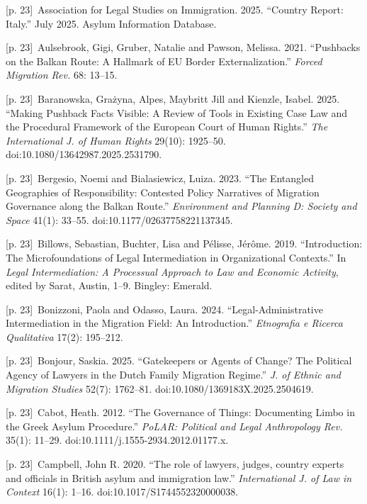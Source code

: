 \documentclass[10pt,a4paper]{article}
\begin{document}
{\scriptsize\color{gray} [p. 23]}\ Association for Legal Studies on Immigration. 2025. “Country Report: Italy.” July 2025. Asylum Information Database.\par
{\scriptsize\color{gray} [p. 23]}\ Aulsebrook, Gigi, Gruber, Natalie and Pawson, Melissa. 2021. “Pushbacks on the Balkan Route: A Hallmark of EU Border Externalization.” \textit{Forced Migration Rev.} 68: 13–15.\par
{\scriptsize\color{gray} [p. 23]}\ Baranowska, Grażyna, Alpes, Maybritt Jill and Kienzle, Isabel. 2025. “Making Pushback Facts Visible: A Review of Tools in Existing Case Law and the Procedural Framework of the European Court of Human Rights.” \textit{The International J. of Human Rights} 29(10): 1925–50. doi:10.1080/13642987.2025.2531790.\par
{\scriptsize\color{gray} [p. 23]}\ Bergesio, Noemi and Bialasiewicz, Luiza. 2023. “The Entangled Geographies of Responsibility: Contested Policy Narratives of Migration Governance along the Balkan Route.” \textit{Environment and Planning D: Society and Space} 41(1): 33–55. doi:10.1177/02637758221137345.\par
{\scriptsize\color{gray} [p. 23]}\ Billows, Sebastian, Buchter, Lisa and Pélisse, Jérôme. 2019. “Introduction: The Microfoundations of Legal Intermediation in Organizational Contexts.” In \textit{Legal Intermediation: A Processual Approach to Law and Economic Activity}, edited by Sarat, Austin, 1–9. Bingley: Emerald.\par
{\scriptsize\color{gray} [p. 23]}\ Bonizzoni, Paola and Odasso, Laura. 2024. “Legal-Administrative Intermediation in the Migration Field: An Introduction.” \textit{Etnografia e Ricerca Qualitativa} 17(2): 195–212.\par
{\scriptsize\color{gray} [p. 23]}\ Bonjour, Saskia. 2025. “Gatekeepers or Agents of Change? The Political Agency of Lawyers in the Dutch Family Migration Regime.” \textit{J. of Ethnic and Migration Studies} 52(7): 1762–81. doi:10.1080/1369183X.2025.2504619.\par
{\scriptsize\color{gray} [p. 23]}\ Cabot, Heath. 2012. “The Governance of Things: Documenting Limbo in the Greek Asylum Procedure.” \textit{PoLAR: Political and Legal Anthropology Rev.} 35(1): 11–29. doi:10.1111/j.1555-2934.2012.01177.x.\par
{\scriptsize\color{gray} [p. 23]}\ Campbell, John R. 2020. “The role of lawyers, judges, country experts and officials in British asylum and immigration law.” \textit{International J. of Law in Context} 16(1): 1–16. doi:10.1017/S1744552320000038.\par
\end{document}
